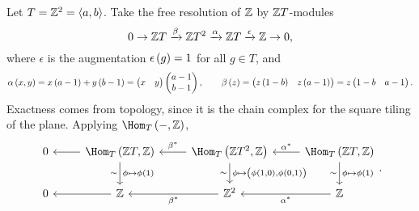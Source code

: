 
Let $ T = \mathbb{Z}^2 = \left\langle a, b \right\rangle $. Take the free resolution of $ \mathbb{Z} $ by $ \mathbb{Z} T $-modules
$$ 0 \to \mathbb{Z} T \xrightarrow{\beta} \mathbb{Z} T^2 \xrightarrow{\alpha} \mathbb{Z} T \xrightarrow{\epsilon} \mathbb{Z} \to 0, $$
where $ \epsilon $ is the augmentation $ \epsilon\br{g} = 1 $ for all $ g \in T $, and
$$ \alpha\br{x, y} = x\br{a - 1} + y\br{b - 1} = \onebytwo{x}{y}\twobyone{a - 1}{b - 1}, \qquad \beta\br{z} = \onebytwo{z\br{1 - b}}{z\br{a - 1}} = z\onebytwo{1 - b}{a - 1}. $$
Exactness comes from topology, since it is the chain complex for the square tiling of the plane. Applying $ \Hom_T\br{-, \ZZ} $,
$$
\begin{tikzcd}
0 & \Hom_T\br{\ZZ T, \ZZ} \arrow{l} \arrow{d}{\phi \mapsto \phi\br{1}}[swap]{\sim} & \Hom_T\br{\ZZ T^2, \ZZ} \arrow{l}[swap]{\beta^*} \arrow{d}{\phi \mapsto \br{\phi\br{1, 0}, \phi\br{0, 1}}}[swap]{\sim} & \Hom_T\br{\ZZ T, \ZZ} \arrow{l}[swap]{\alpha^*} \arrow{d}{\phi \mapsto \phi\br{1}}[swap]{\sim} \\
0 & \ZZ \arrow{l} & \ZZ^2 \arrow{l}{\beta^*} & \ZZ \arrow{l}{\alpha^*}
\end{tikzcd}.
$$

\pagebreak


